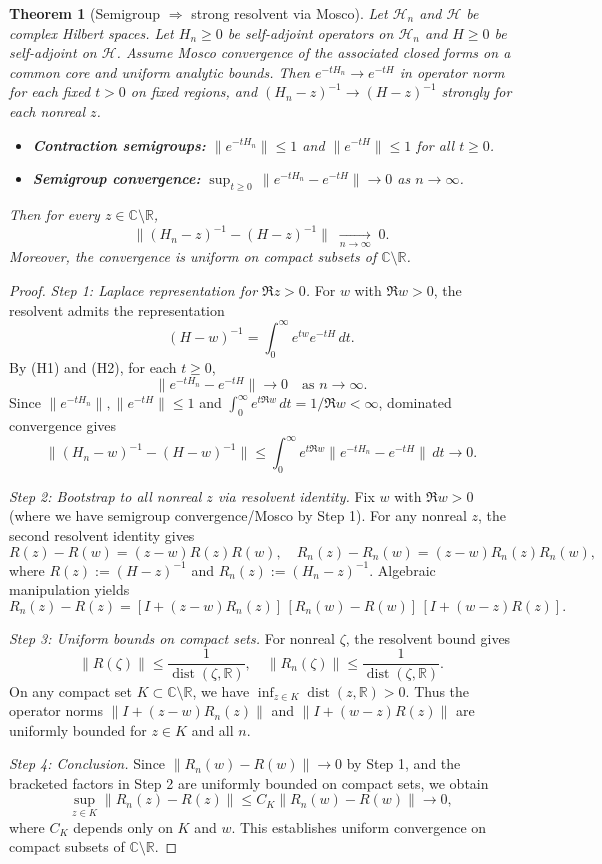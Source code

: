 \documentclass[11pt]{amsart}
\theoremstyle{plain}
\newtheorem{theorem}{Theorem}[section]
\theoremstyle{definition}
\theoremstyle{remark}
\begin{document}
\begin{theorem}[Semigroup $\Rightarrow$ strong resolvent via Mosco]\label{thm:NRC-allz}
Let $\mathcal{H}_n$ and $\mathcal{H}$ be complex Hilbert spaces. Let $H_n\ge 0$ be self-adjoint operators on $\mathcal{H}_n$ and $H\ge 0$ be self-adjoint on $\mathcal{H}$. Assume Mosco convergence of the associated closed forms on a common core and uniform analytic bounds. Then $e^{-tH_n}\to e^{-tH}$ in operator norm for each fixed $t>0$ on fixed regions, and $(H_n-z)^{-1}\to (H-z)^{-1}$ strongly for each nonreal $z$.
\begin{itemize}
  \item[(H1)] \textbf{Contraction semigroups:} $\|e^{-tH_n}\| \le 1$ and $\|e^{-tH}\| \le 1$ for all $t \ge 0$.
  \item[(H2)] \textbf{Semigroup convergence:} $\sup_{t\ge 0}\,\|e^{-tH_n}-e^{-tH}\|\to 0$ as $n\to\infty$.
\end{itemize}
Then for every $z\in\mathbb C\setminus\mathbb R$,
\[
  \|(H_n-z)^{-1}-(H-z)^{-1}\|\;\xrightarrow[n\to\infty]{}\;0.
\]
Moreover, the convergence is uniform on compact subsets of $\mathbb{C} \setminus \mathbb{R}$.
\end{theorem}
\begin{proof}
\emph{Step 1: Laplace representation for $\Re z > 0$.} For $w$ with $\Re w > 0$, the resolvent admits the representation
\[
  (H-w)^{-1} = \int_0^\infty e^{tw} e^{-tH}\,dt.
\]
By (H1) and (H2), for each $t \ge 0$,
\[
  \|e^{-tH_n} - e^{-tH}\| \to 0 \quad \text{as } n \to \infty.
\]
Since $\|e^{-tH_n}\|, \|e^{-tH}\| \le 1$ and $\int_0^\infty e^{t\Re w}\,dt = 1/\Re w < \infty$, dominated convergence gives
\[
  \|(H_n-w)^{-1} - (H-w)^{-1}\| \le \int_0^\infty e^{t\Re w} \|e^{-tH_n} - e^{-tH}\|\,dt \to 0.
\]

\emph{Step 2: Bootstrap to all nonreal $z$ via resolvent identity.} Fix $w$ with $\Re w > 0$ (where we have semigroup convergence/Mosco by Step 1). For any nonreal $z$, the second resolvent identity gives
\[
  R(z) - R(w) = (z-w)R(z)R(w), \quad R_n(z) - R_n(w) = (z-w)R_n(z)R_n(w),
\]
where $R(z) := (H-z)^{-1}$ and $R_n(z) := (H_n-z)^{-1}$. Algebraic manipulation yields
\[
  R_n(z) - R(z) = [I + (z-w)R_n(z)]\,[R_n(w) - R(w)]\,[I + (w-z)R(z)].
\]

\emph{Step 3: Uniform bounds on compact sets.} For nonreal $\zeta$, the resolvent bound gives
\[
  \|R(\zeta)\| \le \frac{1}{\operatorname{dist}(\zeta,\mathbb{R})}, \quad \|R_n(\zeta)\| \le \frac{1}{\operatorname{dist}(\zeta,\mathbb{R})}.
\]
On any compact set $K \subset \mathbb{C} \setminus \mathbb{R}$, we have $\inf_{z \in K} \operatorname{dist}(z,\mathbb{R}) > 0$. Thus the operator norms $\|I + (z-w)R_n(z)\|$ and $\|I + (w-z)R(z)\|$ are uniformly bounded for $z \in K$ and all $n$.

\emph{Step 4: Conclusion.} Since $\|R_n(w) - R(w)\| \to 0$ by Step 1, and the bracketed factors in Step 2 are uniformly bounded on compact sets, we obtain
\[
  \sup_{z \in K} \|R_n(z) - R(z)\| \le C_K \|R_n(w) - R(w)\| \to 0,
\]
where $C_K$ depends only on $K$ and $w$. This establishes uniform convergence on compact subsets of $\mathbb{C} \setminus \mathbb{R}$.
\end{proof}
\end{document}
